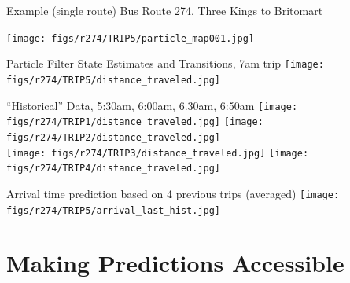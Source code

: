 \documentclass[10pt,t]{beamer}
\begin{document}
{ %
\begin{frame}{Example (single route)}
  Bus Route 274, Three Kings to Britomart


  \begin{overprint}
    \centering
    \texttt{[image: figs/r274/TRIP5/particle\_map001.jpg]}

    \vspace{2em}
    Particle Filter State Estimates and Transitions, 7am trip
    \centering
    \texttt{[image: figs/r274/TRIP5/distance\_traveled.jpg]}

    \vspace{2em}
    ``Historical'' Data, 5:30am, 6:00am, 6.30am, 6:50am
    \centering
    \texttt{[image: figs/r274/TRIP1/distance\_traveled.jpg]}
    \texttt{[image: figs/r274/TRIP2/distance\_traveled.jpg]}\\
    \texttt{[image: figs/r274/TRIP3/distance\_traveled.jpg]}
    \texttt{[image: figs/r274/TRIP4/distance\_traveled.jpg]}

    \vspace{2em}
    Arrival time prediction based on 4 previous trips (averaged)
    \centering
    \texttt{[image: figs/r274/TRIP5/arrival\_last\_hist.jpg]}
  \end{overprint}
\end{frame}
}


\section{Making Predictions Accessible}
\end{document}
